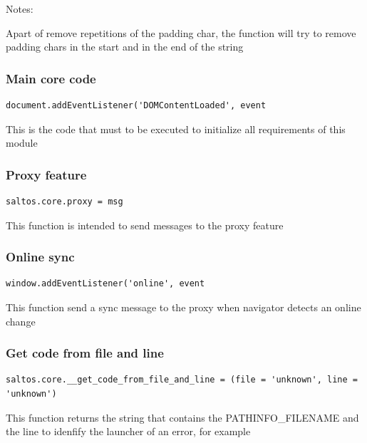 \documentclass[a4paper]{article}
\begin{document}
Notes:

Apart of remove repetitions of the padding char, the function will try to
remove padding chars in the start and in the end of the string

\hypertarget{toc157}{}
\subsubsection{Main core code}

\begin{lstlisting}
document.addEventListener('DOMContentLoaded', event
\end{lstlisting}

This is the code that must to be executed to initialize all requirements of this module

\hypertarget{toc158}{}
\subsubsection{Proxy feature}

\begin{lstlisting}
saltos.core.proxy = msg
\end{lstlisting}

This function is intended to send messages to the proxy feature

\hypertarget{toc159}{}
\subsubsection{Online sync}

\begin{lstlisting}
window.addEventListener('online', event
\end{lstlisting}

This function send a sync message to the proxy when navigator detects an online change

\hypertarget{toc160}{}
\subsubsection{Get code from file and line}

\begin{lstlisting}
saltos.core.__get_code_from_file_and_line = (file = 'unknown', line = 'unknown')
\end{lstlisting}

This function returns the string that contains the PATHINFO\_FILENAME and the line to idenfify
the launcher of an error, for example
\end{document}
